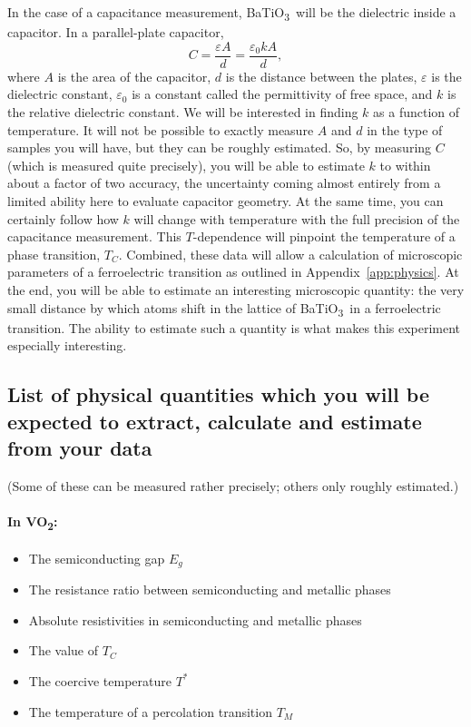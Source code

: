 \documentclass[11pt,a4paper]{article}
\newcommand{\VOtwo}{VO\textsubscript{2}}
\newcommand{\BTO}{BaTiO\textsubscript{3}}
\begin{document}
In the case of a capacitance measurement, \BTO\ will be the dielectric inside a
capacitor. In a parallel-plate capacitor,
\begin{equation}
  C = \frac{\varepsilon A}{d} = \frac{\varepsilon_0 k A}{d},
\end{equation}
where $A$ is the area of the capacitor, $d$ is the distance between the plates,
$\varepsilon$ is the dielectric constant, $\varepsilon_0$ is a constant called
the permittivity of free space, and $k$ is the relative dielectric constant. We
will be interested in finding $k$ as a function of temperature. It will not be
possible to exactly measure $A$ and $d$ in the type of samples you will have,
but they can be roughly estimated. So, by measuring $C$ (which is measured quite
precisely), you will be able to estimate $k$ to within about a factor of two
accuracy, the uncertainty coming almost entirely from a limited ability here to
evaluate capacitor geometry. At the same time, you can certainly follow how $k$
will change with temperature with the full precision of the capacitance
measurement. This $T$-dependence will pinpoint the temperature of a phase
transition, $T_C$. Combined, these data will allow a calculation of microscopic parameters
of a ferroelectric transition as outlined in Appendix~\ref{app:physics}. At the
end, you will be able to estimate an interesting microscopic quantity: the very
small distance by which atoms shift in the lattice of \BTO\ in a ferroelectric
transition. The ability to estimate such a quantity is what makes this
experiment especially interesting.

\subsection*{List of physical quantities which you will be expected to extract,
calculate and estimate from your data}

\noindent(Some of these can be measured rather precisely; others only roughly
estimated.)

\paragraph{In \VOtwo:}
\begin{itemize}
  \item The semiconducting gap $E_g$
  \item The resistance ratio between semiconducting and metallic phases
  \item Absolute resistivities in semiconducting and metallic phases
  \item The value of $T_C$
  \item The coercive temperature $T^{*}$
  \item The temperature of a percolation transition $T_M$
\end{itemize}
\end{document}

